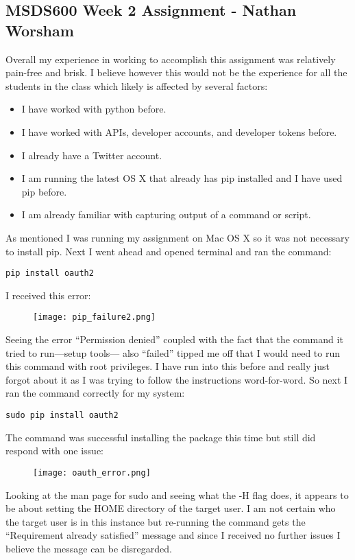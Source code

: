 \documentclass[10pt]{article}
\begin{document}
\subsection*{MSDS600 Week 2 Assignment - Nathan Worsham}
Overall my experience in working to accomplish this assignment was relatively pain-free and brisk. I believe however this would not be the experience for all the students in the class which likely is affected by several factors: 
\begin{itemize}
\item I have worked with python before.
\item I have worked with APIs, developer accounts, and developer tokens before.
\item I already have a Twitter account.
\item I am running the latest OS X that already has pip installed and I have used pip before.
\item I am already familiar with capturing output of a command or script.
\end{itemize}
As mentioned I was running my assignment on Mac OS X so it was not necessary to install pip. Next I went ahead and opened terminal and ran the command:
\begin{verbatim}
pip install oauth2 
\end{verbatim}
I received this error: 
\begin{figure}[!h]
\texttt{[image: pip\_failure2.png]}
\centering
\end{figure}



Seeing the error “Permission denied” coupled with the fact that the command it tried to run—setup tools— also “failed” tipped me off that I would need to run this command with root privileges. I have run into this before and really just forgot about it as I was trying to follow the instructions word-for-word. So next I ran the command correctly for my system: 
\begin{verbatim}
sudo pip install oauth2 
\end{verbatim}
The command was successful installing the package this time but still did respond with one issue: \clearpage

\begin{figure}[!h]
\texttt{[image: oauth\_error.png]}
\centering
\end{figure}
\noindent
Looking at the man page for sudo and seeing what the -H flag does, it appears to be about setting the HOME directory of the target user. I am not certain who the target user is in this instance but re-running the command gets the “Requirement already satisfied” message and since I received no further issues I believe the message can be disregarded.  
\end{document}
